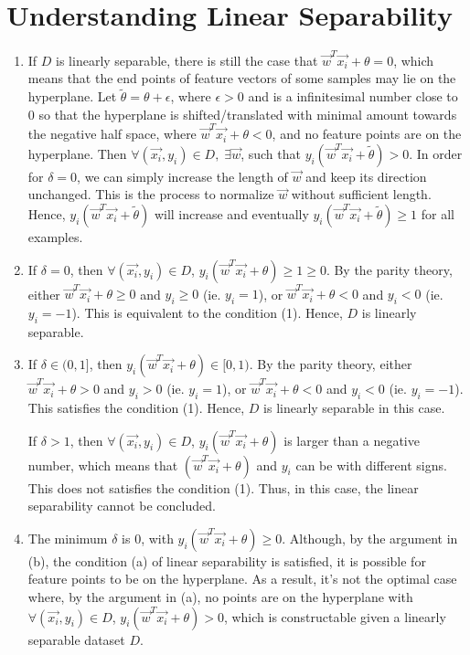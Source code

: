 \documentclass[11pt]{article}
\begin{document}
\section{Understanding Linear Separability}
\begin{enumerate}[label=(\alph*)]
\item
    If $D$ is linearly separable, there is still the case that $\vec{w}^T\vec{x_i} + \theta = 0$, which means that the end points of feature vectors of some samples may lie on the hyperplane. Let $\tilde{\theta} = \theta + \epsilon$, where $\epsilon > 0$ and is a infinitesimal number close to 0 so that the hyperplane is shifted/translated with minimal amount towards the negative half space, where $\vec{w}^T\vec{x_i} + \theta < 0$, and no feature points are on the hyperplane. Then $\forall (\vec{x_i}, y_i) \in D,\; \exists\vec{w}$, such that $y_i(\vec{w}^T\vec{x_i} + \tilde{\theta}) > 0$. In order for $\delta = 0$, we can simply increase the length of $\vec{w}$ and keep its direction unchanged. This is the process to normalize $\vec{w}$ without sufficient length. Hence, $y_i(\vec{w}^T\vec{x_i} + \tilde{\theta})$ will increase and eventually $y_i(\vec{w}^T\vec{x_i} + \tilde{\theta}) \geq 1$ for all examples.

\item
    If $\delta = 0$, then $\forall (\vec{x_i}, y_i) \in D$, $y_i(\vec{w}^T\vec{x_i} + \theta) \geq 1 \geq 0$. By the parity theory, either $\vec{w}^T\vec{x_i} + \theta \geq 0$ and $y_i \geq 0$ (ie. $y_i = 1$), or $\vec{w}^T\vec{x_i} + \theta < 0$ and $y_i < 0$ (ie. $y_i = -1$). This is equivalent to the condition (1). Hence, $D$ is linearly separable.

\item
    If $\delta \in (0, 1]$, then $y_i(\vec{w}^T\vec{x_i} + \theta) \in [0,1)$. By the parity theory, either $\vec{w}^T\vec{x_i} + \theta > 0$ and $y_i > 0$ (ie. $y_i = 1$), or $\vec{w}^T\vec{x_i} + \theta < 0$ and $y_i < 0$ (ie. $y_i = -1$). This satisfies the condition (1). Hence, $D$ is linearly separable in this case.

    If $\delta > 1$, then $\forall (\vec{x_i}, y_i) \in D$, $y_i(\vec{w}^T\vec{x_i} + \theta)$ is larger than a negative number, which means that $(\vec{w}^T\vec{x_i} + \theta)$ and $y_i$ can be with different signs. This does not satisfies the condition (1). Thus, in this case, the linear separability cannot be concluded.

\item
    The minimum $\delta$ is 0, with $y_i(\vec{w}^T\vec{x_i} + \theta) \geq 0$. Although, by the argument in (b), the condition (a) of linear separability is satisfied, it is possible for feature points to be on the hyperplane. As a result, it's not the optimal case where, by the argument in (a), no points are on the hyperplane with $\forall (\vec{x_i}, y_i) \in D$, $y_i(\vec{w}^T\vec{x_i} + \theta) > 0$, which is constructable given a linearly separable dataset $D$.


\end{enumerate}
\end{document}
